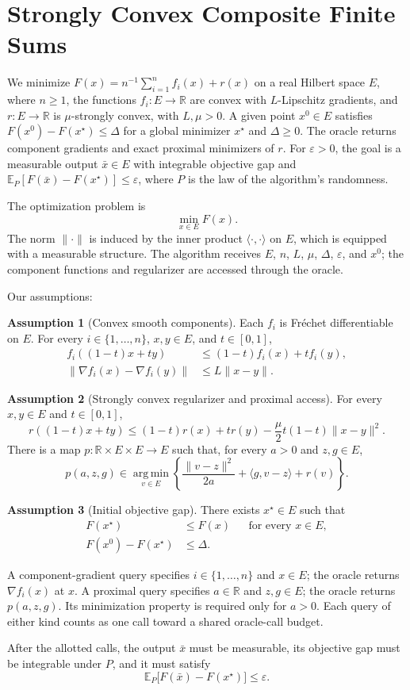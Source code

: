 \documentclass[10pt]{article}
\theoremstyle{definition}
\newtheorem{assumption}{Assumption}
\begin{document}
\section*{Strongly Convex Composite Finite Sums}
We minimize $F(x)=n^{-1}\sum_{i=1}^n f_i(x)+r(x)$ on a real Hilbert space $E$, where $n\geq1$, the functions $f_i:E\to\mathbb{R}$ are convex with $L$-Lipschitz gradients, and $r:E\to\mathbb{R}$ is $\mu$-strongly convex, with $L,\mu>0$. A given point $x^0\in E$ satisfies $F(x^0)-F(x^\star)\leq\Delta$ for a global minimizer $x^\star$ and $\Delta\geq0$. The oracle returns component gradients and exact proximal minimizers of $r$. For $\varepsilon>0$, the goal is a measurable output $\bar{x}\in E$ with integrable objective gap and $\mathbb{E}_{P}[F(\bar{x})-F(x^\star)]\leq\varepsilon$, where $P$ is the law of the algorithm's randomness.

The optimization problem is
\[
\min_{x\in E} F(x).
\]
The norm $\|\cdot\|$ is induced by the inner product $\langle\cdot,\cdot\rangle$ on $E$, which is equipped with a measurable structure. The algorithm receives $E$, $n$, $L$, $\mu$, $\Delta$, $\varepsilon$, and $x^0$; the component functions and regularizer are accessed through the oracle.

Our assumptions:
\begin{assumption}[Convex smooth components]
Each $f_i$ is Fr\'echet differentiable on $E$. For every $i\in\{1,\ldots,n\}$, $x,y\in E$, and $t\in[0,1]$,
\[
\begin{aligned}
f_i((1-t)x+ty)&\leq(1-t)f_i(x)+t f_i(y),\\
\|\nabla f_i(x)-\nabla f_i(y)\|&\leq L\|x-y\|.
\end{aligned}
\]
\end{assumption}

\begin{assumption}[Strongly convex regularizer and proximal access]
For every $x,y\in E$ and $t\in[0,1]$,
\[
r((1-t)x+ty)
\leq (1-t)r(x)+t r(y)
-\frac{\mu}{2}t(1-t)\|x-y\|^2.
\]
There is a map $p:\mathbb{R}\times E\times E\to E$ such that, for every $a>0$ and $z,g\in E$,
\[
p(a,z,g)\in\operatorname*{arg\,min}_{v\in E}
\left\{\frac{\|v-z\|^2}{2a}+\langle g,v-z\rangle+r(v)\right\}.
\]
\end{assumption}

\begin{assumption}[Initial objective gap]
There exists $x^\star\in E$ such that
\[
\begin{aligned}
F(x^\star)&\leq F(x) &&\text{for every }x\in E,\\
F(x^0)-F(x^\star)&\leq\Delta.
\end{aligned}
\]
\end{assumption}

A component-gradient query specifies $i\in\{1,\ldots,n\}$ and $x\in E$; the oracle returns $\nabla f_i(x)$ at $x$. A proximal query specifies $a\in\mathbb{R}$ and $z,g\in E$; the oracle returns $p(a,z,g)$. Its minimization property is required only for $a>0$. Each query of either kind counts as one call toward a shared oracle-call budget.

After the allotted calls, the output $\bar{x}$ must be measurable, its objective gap must be integrable under $P$, and it must satisfy
\[
\mathbb{E}_{P}\bigl[F(\bar{x})-F(x^\star)\bigr]\leq\varepsilon.
\]
\end{document}

